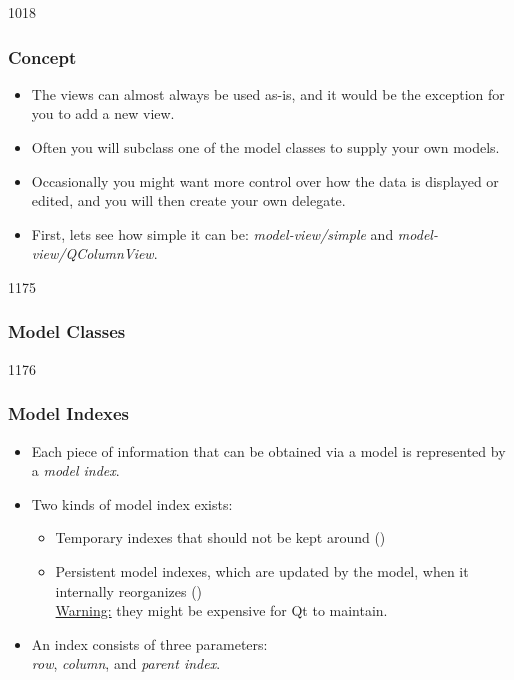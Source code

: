 \begin{slide}[fragile]{1018}\frametitle{Concept}
\begin{itemize}
\item The views can almost always be used as-is, and it would be the exception
  for you to add a new view.
\item Often you will subclass one of the model classes to supply your own
  models.
\item Occasionally you might want more control over how the data is
  displayed or edited, and you will then create your own delegate.
\item First, lets see how simple it can be:
  \emph{model-view/simple} and
  \emph{model-view/QColumnView}.
\end{itemize}
\end{slide}

\begin{slide}[fragile]{1175}\frametitle{Model Classes}
\vfill
{}
\vfill
\end{slide}

\begin{slide}{1176}\frametitle{Model Indexes}\label{modelIndexes}
\begin{itemize}
\item Each piece of information that can be obtained via a model is
  represented by a \emph{model index}.
\item Two kinds of model index exists:
  \begin{itemize}
  \item Temporary indexes that should not be kept around
    ()
  \item Persistent model indexes, which are updated by the model, when it
    internally reorganizes ()\\
    \underline{Warning:} they might be expensive for Qt to maintain.
  \end{itemize}
  \item An index consists of three parameters:\\
    \emph{row}, \emph{column}, and \emph{parent index}.
\end{itemize}
\end{slide}

